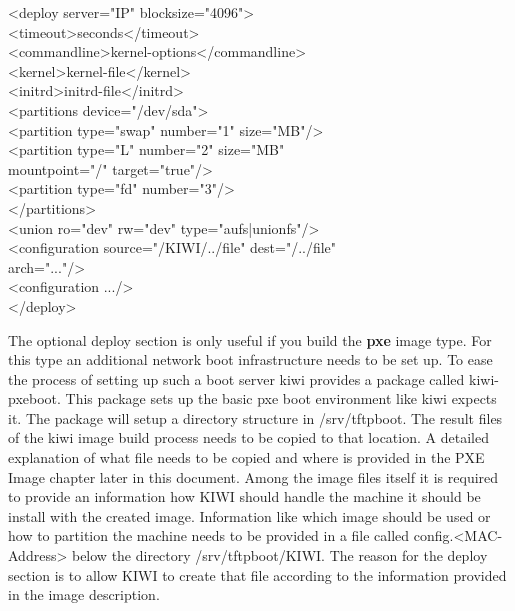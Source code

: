 \begin{Command}{14cm}
<deploy server="IP" blocksize="4096">\\
\hspace*{1cm}<timeout>seconds</timeout>\\
\hspace*{1cm}<commandline>kernel-options</commandline>\\
\hspace*{1cm}<kernel>kernel-file</kernel>\\
\hspace*{1cm}<initrd>initrd-file</initrd>\\
\hspace*{1cm}<partitions device="/dev/sda">\\
\hspace*{2cm}<partition type="swap" number="1" size="MB"/>\\
\hspace*{2cm}<partition type="L" number="2" size="MB"\\
\hspace*{4.5cm}mountpoint="/" target="true"/>\\
\hspace*{2cm}<partition type="fd" number="3"/>\\
\hspace*{1cm}</partitions>\\
\hspace*{1cm}<union ro="dev" rw="dev" type="aufs|unionfs"/>\\
\hspace*{1cm}<configuration source="/KIWI/../file" dest="/../file"\\
\hspace*{4.5cm}arch="..."/>\\
\hspace*{1cm}<configuration .../>\\
</deploy>
\end{Command}

The optional deploy section is only useful if you build the \textbf{pxe}
image type. For this type an additional network boot infrastructure needs
to be set up. To ease the process of setting up such a boot server kiwi
provides a package called kiwi-pxeboot. This package sets up the basic
pxe boot environment like kiwi expects it. The package will setup a
directory structure in /srv/tftpboot. The result files of the kiwi
image build process needs to be copied to that location. A detailed
explanation of what file needs to be copied and where is provided in
the PXE Image chapter later in this document. Among the image files itself
it is required to provide an information how KIWI should handle the
machine it should be install with the created image. Information like
which image should be used or how to partition the machine needs to
be provided in a file called config.<MAC-Address> below the directory
/srv/tftpboot/KIWI. The reason for the deploy section is to allow KIWI
to create that file according to the information provided in the image
description.


